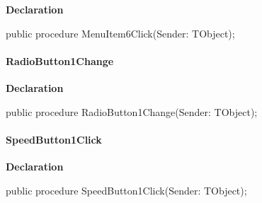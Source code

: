 \documentclass{report}
\newif\ifpdf
\begin{document}
\label{prjwizard.TfrmProjectWizard-MenuItem6Click}
\begin{list}{}{
\setlength{\itemindent}{0cm}
\setlength{\listparindent}{0cm}
\setlength{\leftmargin}{\evensidemargin}
\addtolength{\leftmargin}{\tmplength}
\settowidth{\labelsep}{X}
\addtolength{\leftmargin}{\labelsep}
\setlength{\labelwidth}{\tmplength}
}
\item[\textbf{Declaration}\hfill]
\ifpdf
\begin{flushleft}
\fi
\begin{ttfamily}
public procedure MenuItem6Click(Sender: TObject);\end{ttfamily}

\ifpdf
\end{flushleft}
\fi

\end{list}
\paragraph*{RadioButton1Change}\hspace*{\fill}

\label{prjwizard.TfrmProjectWizard-RadioButton1Change}
\begin{list}{}{
\setlength{\itemindent}{0cm}
\setlength{\listparindent}{0cm}
\setlength{\leftmargin}{\evensidemargin}
\addtolength{\leftmargin}{\tmplength}
\settowidth{\labelsep}{X}
\addtolength{\leftmargin}{\labelsep}
\setlength{\labelwidth}{\tmplength}
}
\item[\textbf{Declaration}\hfill]
\ifpdf
\begin{flushleft}
\fi
\begin{ttfamily}
public procedure RadioButton1Change(Sender: TObject);\end{ttfamily}

\ifpdf
\end{flushleft}
\fi

\end{list}
\paragraph*{SpeedButton1Click}\hspace*{\fill}

\label{prjwizard.TfrmProjectWizard-SpeedButton1Click}
\begin{list}{}{
\setlength{\itemindent}{0cm}
\setlength{\listparindent}{0cm}
\setlength{\leftmargin}{\evensidemargin}
\addtolength{\leftmargin}{\tmplength}
\settowidth{\labelsep}{X}
\addtolength{\leftmargin}{\labelsep}
\setlength{\labelwidth}{\tmplength}
}
\item[\textbf{Declaration}\hfill]
\ifpdf
\begin{flushleft}
\fi
\begin{ttfamily}
public procedure SpeedButton1Click(Sender: TObject);\end{ttfamily}

\ifpdf
\end{flushleft}
\fi

\end{list}
\end{document}
